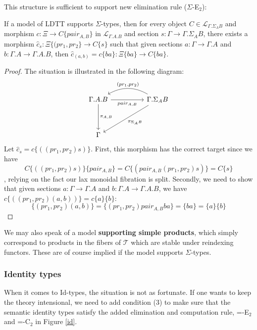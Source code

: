 \documentclass[a4paper,english]{lipics-v2018}
\begin{document}
This structure is sufficient to support new elimination rule ($\Sigma$-E$_2$):
\begin{theorem}
If a model of LDTT supports $\Sigma$-types, then for every object $C \in \mathcal{L}_{\Gamma.\Sigma_AB}$ and morphism $c : \Xi \to C\{pair_{A,B}\}$ in $\mathcal{L}_{\Gamma.A.B}$ and section $s : \Gamma \to \Gamma.\Sigma_AB$, there exists a morphism $\hat c_s : \Xi\{(pr_1, pr_2\} \to C\{s\}$ such that given sections $a : \Gamma \to \Gamma.A$ and $b : \Gamma.A \to \Gamma.A.B$, then $\hat c_{(a, b)} = c\{ba\} : \Xi\{ba\} \to C\{ba\}$.
\begin{proof}
  The situation is illustrated in the following diagram:
    \[
      \begin{tikzcd}[row sep=huge, column sep=huge]
      \Gamma.A.B \ar[d, "\pi_{A,B}"] \ar[r,"pair_{A,B}",swap] & \Gamma.\Sigma_AB \ar[l,"{(pr_1, pr_2)}",bend right,swap] \ar[dl, "\pi_{\Sigma_AB}"]\\
      \Gamma &
      \end{tikzcd}
    \]
Let $\hat c_s = c\{((pr_1, pr_2)s)\}$. First, this morphism has the correct target since we have
    \[
      C\{((pr_1,pr_2)s)\}\{pair_{A,B}\} = C\{(pair_{A,B}(pr_1,pr_2)s)\} = C\{s\}
    \]
    , relying on the fact our lax monoidal fibration is split. Secondly, we need to show that given sections $a : \Gamma \to \Gamma.A$ and $b : \Gamma.A \to \Gamma.A.B$, we have $c\{((pr_1,pr_2)(a, b))\} = c\{a\}\{b\}$:
    \[
      \{(pr_1,pr_2)(a, b)\} = \{(pr_1,pr_2)pair_{A,B}ba\} = \{ba\} = \{a\}\{b\}
    \]
  \end{proof}
\end{theorem}
We may also speak of a model \textbf{supporting simple products}, which simply correspond to products in the fibers of $\mathcal{T}$ which are stable under reindexing functors. These are of course implied if the model supports $\Sigma$-types.
\subsubsection{Identity types}
When it comes to Id-types, the situation is not as fortunate. If one wants to keep the theory intensional, we need to add condition (3) to make sure that the semantic identity types satisfy the added elimination and computation rule, =-E$_2$ and =-C$_2$ in Figure \ref{id}.
\end{document}
